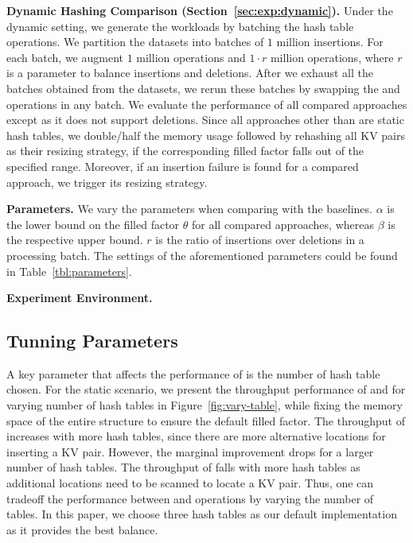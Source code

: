 \vspace{1mm}\noindent\textbf{Dynamic Hashing Comparison (Section~\ref{sec:exp:dynamic}).}
Under the dynamic setting, we generate the workloads by batching the hash table operations. 
We partition the datasets into batches of $1$ million insertions. 
For each batch, we augment $1$ million  operations and $1 \cdot r$ million  operations,
where $r$ is a parameter to balance insertions and deletions.
After we exhaust all the batches obtained from the datasets, we rerun these batches by swapping the  and  operations in any batch. 
We evaluate the performance of all compared approaches except \cudpp as it does not support deletions. 
Since all approaches other than \voter are static hash tables, we double/half the memory usage followed by rehashing all KV pairs as their resizing strategy, if the corresponding filled factor falls out of the specified range. 
Moreover, if an insertion failure is found for a compared approach, we trigger its resizing strategy.


\vspace{1mm}\noindent\textbf{Parameters.}
We vary the parameters when comparing \voter with the baselines.
$\alpha$ is the lower bound on the filled factor $\theta$ for all compared approaches,
whereas $\beta$ is the respective upper bound.
$r$ is the ratio of insertions over deletions in a processing batch. 
The settings of the aforementioned parameters could be found in Table~\ref{tbl:parameters}.

\vspace{1mm}\noindent\textbf{Experiment Environment.}

\subsection{Tunning Parameters}

A key parameter that affects the performance of \voter is the number of hash table chosen. For the static scenario, we present the throughput performance of  and  for varying number of hash tables in Figure~\ref{fig:vary-table}, while fixing the memory space of the entire structure to ensure the default filled factor. 
The throughput of  increases with more hash tables, since there are more alternative locations for inserting a KV pair. However, the marginal improvement drops for a larger number of hash tables. The throughput of  falls with more hash tables as additional locations need to be scanned to locate a KV pair. Thus, one can tradeoff the performance between  and  operations by varying the number of tables.
In this paper, we choose three hash tables as our default implementation as it provides the best balance. 


